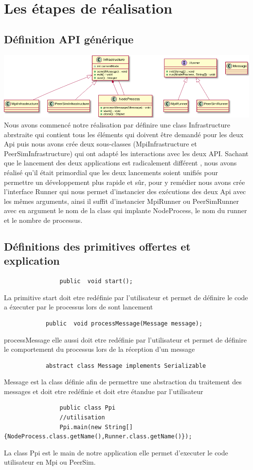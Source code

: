 \documentclass{article}
\begin{document}
		\section{Les étapes de réalisation}
			\subsection{Définition API générique}
			\includegraphics[width=19cm]{Ppi_uml.png}
			Nous avons commencé notre réalisation par définire une class Infrastructure abrstraite qui contient tous les éléments qui doivent être demandé pour les deux Api
			puis nous avons crée deux sous-classes (MpiInfrastructure et PeerSimInfrastructure) qui ont adapté les interactions avec les deux API.
			\newline
			Sachant que le lancement des deux applications est radicalement différent 
			, nous avons réalisé qu'il était primordial que les deux 
			lancements soient unifiés pour permettre un développement plus rapide et sûr, pour y remédier nous avons crée l'interface Runner qui nous permet 
			d'instancier des exécutions des deux Api avec les mêmes arguments, ainsi il suffit d'instancier MpiRunner ou PeerSimRunner avec en argument
			le nom de la class qui implante NodeProcess, le nom du runner et le nombre de processus.
			\subsection{Définitions des primitives offertes et explication}
			\begin{lstlisting}
				public  void start();
			\end{lstlisting}
			La primitive start  doit etre redéfinie par l'utilisateur et permet de définire le code a éxecuter par le processus lors de sont lancement
			\begin{lstlisting}
			public  void processMessage(Message message);
			\end{lstlisting}
			processMessage elle aussi doit etre redéfinie par l'utilisateur et permet  de définire le comportement du processus lors de la réception 
			d'un message
			\begin{lstlisting}
			abstract class Message implements Serializable
			\end{lstlisting}
			Message est la class définie afin de permettre une abstraction du traitement des messages et doit etre redéfinie et doit etre étandue par 
			l'utilisateur
			\newpage
			\begin{lstlisting}
				public class Ppi
				//utilisation
				Ppi.main(new String[] {NodeProcess.class.getName(),Runner.class.getName()});
			\end{lstlisting}
			La class Ppi est le main de notre application elle permet d'executer le code utilisateur en Mpi ou PeerSim.
\end{document}
